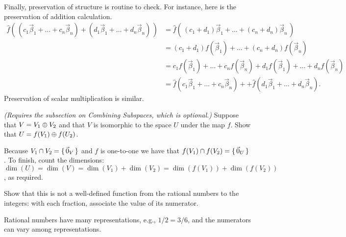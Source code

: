 \begin{exercises}
\begin{answer}
      Finally, preservation of structure is routine to check.
      For instance, here is the preservation of addition calculation.
      \begin{align*}
        \hat{f}(\,(c_1\vec{\beta}_1+\dots+c_n\vec{\beta}_n)+
                  (d_1\vec{\beta}_1+\dots+d_n\vec{\beta}_n)\,)
        &=\hat{f}(\,(c_1+d_1)\vec{\beta}_1+\dots+(c_n+d_n)\vec{\beta}_n\,) \\
        &=(c_1+d_1)f(\vec{\beta}_1)+\dots+(c_n+d_n)f(\vec{\beta}_n) \\
        &=c_1f(\vec{\beta}_1)+\dots+c_nf(\vec{\beta}_n)
          +d_1f(\vec{\beta}_1)+\dots+d_nf(\vec{\beta}_n) \\
        &=\hat{f}(c_1\vec{\beta}_1+\dots+c_n\vec{\beta}_n)+
          +\hat{f}(d_1\vec{\beta}_1+\dots+d_n\vec{\beta}_n).
      \end{align*}
      Preservation of scalar multiplication is similar.   
    \end{answer}
  \item 
    \textit{(Requires the subsection on Combining Subspaces,
    which is optional.)}
    Suppose that \( V=V_1\oplus V_2 \) and that 
    \( V \) is isomorphic to the space \( U \) under the map \( f \).
    Show that \( U=f(V_1)\oplus f(U_2) \).
    \begin{answer}
      Because \( V_1\cap V_2=\mbox{$\{\,\vec{0}_V\,\}$} \) and \( f \) is
      one-to-one we have that \( f(V_1)\cap f(V_2)=\mbox{$\{\,\vec{0}_U\,\}$} \).
      To finish, count the dimensions:
      \( \dim(U)=\dim(V)=\dim(V_1)+\dim(V_2)=\dim(f(V_1))+\dim(f(V_2)) \),
      as required.  
    \end{answer}
  \item Show that this is not a well-defined function from the rational numbers
    to the integers: with each fraction, associate the value of its numerator.
    \begin{answer}
      Rational numbers have many representations, e.g.,
      \( 1/2=3/6 \), and the numerators can vary among
      representations.
    \end{answer}
\end{exercises}
